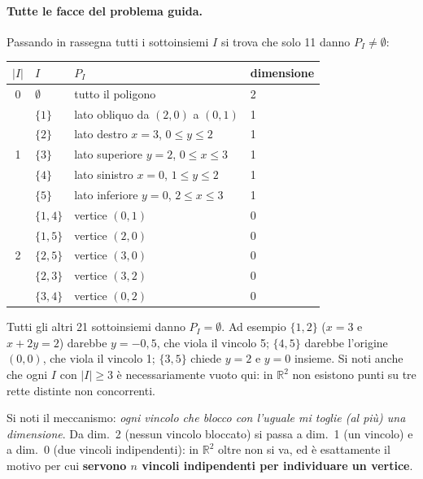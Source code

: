 \documentclass[12pt]{extarticle} %
\begin{document}
\paragraph{Tutte le facce del problema guida.} Passando in rassegna tutti i sottoinsiemi $I$ si trova che solo 11 danno $P_I \ne \emptyset$:
\begin{center}
\begin{tabular}{clll}
\hline
$|I|$ & $I$ & $P_I$ & dimensione \\
\hline
0 & $\emptyset$ & tutto il poligono & 2 \\
\hline
\multirow{5}{*}{1} & $\{1\}$ & lato obliquo da $(2,0)$ a $(0,1)$ & 1 \\
 & $\{2\}$ & lato destro $x=3$, $0\le y\le2$ & 1 \\
 & $\{3\}$ & lato superiore $y=2$, $0\le x\le3$ & 1 \\
 & $\{4\}$ & lato sinistro $x=0$, $1\le y\le2$ & 1 \\
 & $\{5\}$ & lato inferiore $y=0$, $2\le x\le3$ & 1 \\
\hline
\multirow{5}{*}{2} & $\{1,4\}$ & vertice $(0,1)$ & 0 \\
 & $\{1,5\}$ & vertice $(2,0)$ & 0 \\
 & $\{2,5\}$ & vertice $(3,0)$ & 0 \\
 & $\{2,3\}$ & vertice $(3,2)$ & 0 \\
 & $\{3,4\}$ & vertice $(0,2)$ & 0 \\
\hline
\end{tabular}
\end{center}
Tutti gli altri 21 sottoinsiemi danno $P_I=\emptyset$. Ad esempio $\{1,2\}$ ($x=3$ e $x+2y=2$) darebbe $y=-0{,}5$, che viola il vincolo 5; $\{4,5\}$ darebbe l'origine $(0,0)$, che viola il vincolo 1; $\{3,5\}$ chiede $y=2$ e $y=0$ insieme. Si noti anche che ogni $I$ con $|I|\ge3$ è necessariamente vuoto qui: in $\mathbb{R}^2$ non esistono punti su tre rette distinte non concorrenti.

\medskip
\noindent Si noti il meccanismo: \emph{ogni vincolo che blocco con l'uguale mi toglie (al più) una dimensione}. Da dim.\ 2 (nessun vincolo bloccato) si passa a dim.\ 1 (un vincolo) e a dim.\ 0 (due vincoli indipendenti): in $\mathbb{R}^2$ oltre non si va, ed è esattamente il motivo per cui \textbf{servono $n$ vincoli indipendenti per individuare un vertice}.
\end{document}
